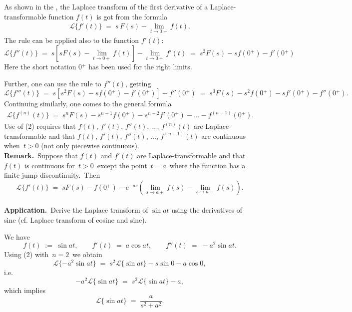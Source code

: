 \documentclass[12pt]{article}
\begin{document}
As shown in the ,
the Laplace transform of the first derivative of a Laplace-transformable 
function $f(t)$ is got from the formula
\begin{align}
\mathcal{L}\{f'(t)\} \;=\; s\,F(s)-\lim_{t\to0+}\!f(t).
\end{align}
The rule can be applied also to the function $f'(t)$:
$$\mathcal{L}\{f''(t)\} \;=\; s[sF(s)-\lim_{t\to0+}\!f(t)]-\lim_{t\to0+}\!f'(t) 
\;=\; s^2F(s)-sf(0\!^+)-f'(0\!^+)$$
Here the short notation $0\!^+$ has been used for the right limits.

Further, one can use the rule to $f''(t)$, getting
$$\mathcal{L}\{f'''(t)\} \;=\; s[s^2F(s)-sf(0\!^+)-f'(0\!^+)]-f''(0\!^+) 
\;=\; s^3F(s)-s^2f(0\!^+)-sf'(0\!^+)-f''(0\!^+).$$
Continuing similarly, one comes to the general formula
\begin{align}
\mathcal{L}\{f^{(n)}(t)\} 
\;=\;  s^nF(s)-s^{n-1}f(0\!^+)-s^{n-2}f'(0\!^+)-\ldots-f^{(n-1)}(0\!^+).
\end{align}
Use of (2) requires that $f(t)$, $f'(t)$, $f''(t)$, ..., $f^{(n)}(t)$ are 
Laplace-transformable and that $f(t)$, $f'(t)$, $f''(t)$, ..., 
$f^{(n-1)}(t)$ are continuous when\, $t > 0$ (not only 
piecewise continuous).\\

\textbf{Remark.}\, Suppose that $f(t)$ and $f'(t)$ are 
Laplace-transformable and that $f(t)$ is continuous for\, 
$t > 0$\, except the point\, $t = a$\, where the function has a 
finite jump discontinuity.\, Then
$$\mathcal{L}\{f'(t)\} \;=\; 
sF(s)-f(0\!^+)-e^{-as}(\lim_{s\to a+}f(s)-\lim_{s\to a-}f(s)).$$\\



\textbf{Application.}\, Derive the Laplace transform of $\sin{at}$ using the 
derivatives of sine (cf. Laplace transform of cosine and sine).

We have
$$f(t) \;:=\; \sin{at}, \qquad f'(t) \;=\; a\cos{at}, \qquad
f''(t) \;=\; -a^2\sin{at}.$$
Using (2) with\, $n =2$\, we obtain
$$\mathcal{L}\{-a^2\sin{at}\} 
\;=\; s^2\mathcal{L}\{\sin{at}\}-s\sin0-a\cos0,$$
i.e.
$$-a^2\mathcal{L}\{\sin{at}\} \;=\; s^2\mathcal{L}\{\sin{at}\}-a,$$
which implies
$$\mathcal{L}\{\sin{at}\} \;=\; \frac{a}{s^2\!+\!a^2}.$$
\end{document}
